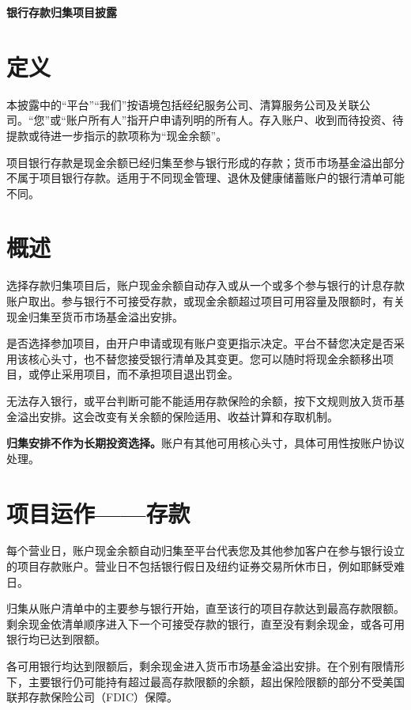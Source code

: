 \documentclass[UTF8,fontset=none,11pt,a4paper]{ctexart}
\begin{document}
{\noindent\fontsize{20}{25}\selectfont\bfseries 银行存款归集项目披露\par}
\vspace{10pt}
\section*{定义}
本披露中的“平台”“我们”按语境包括经纪服务公司、清算服务公司及关联公司。“您”或“账户所有人”指开户申请列明的所有人。存入账户、收到而待投资、待提款或待进一步指示的款项称为“\allowbreak\mbox{现金余额”。}


项目银行存款是现金余额已经归集至参与银行形成的存款；货币市场基金溢出部分不属于项目银行存款。适用于不同现金管理、退休及健康储蓄账户的银行清单\allowbreak\mbox{可能不同。}


\section*{概述}
选择存款归集项目后，账户现金余额自动存入或从一个或多个参与银行的计息存款账户取出。参与银行不可接受存款，或现金余额超过项目可用容量及限额时，有关现金归集至货币市场基金\allowbreak\mbox{溢出安排。}


是否选择参加项目，由开户申请或现有账户变更指示决定。平台不替您决定是否采用该核心头寸，也不替您接受银行清单及其变更。您可以随时将现金余额移出项目，或停止采用项目，而不承担项目\allowbreak\mbox{退出罚金。}


无法存入银行，或平台判断可能不能适用存款保险的余额，按下文规则放入货币基金溢出安排。这会改变有关余额的保险适用、收益计算和\allowbreak\mbox{存取机制。}


\textbf{归集安排不作为长期投资选择。}账户有其他可用核心头寸，具体可用性按账户\allowbreak\mbox{协议处理。}


\section*{项目运作——存款}
每个营业日，账户现金余额自动归集至平台代表您及其他参加客户在参与银行设立的项目存款账户。营业日不包括银行假日及纽约证券交易所休市日，例如耶\allowbreak\mbox{稣受难日。}


归集从账户清单中的主要参与银行开始，直至该行的项目存款达到最高存款限额。剩余现金依清单顺序进入下一个可接受存款的银行，直至没有剩余现金，或各可用银行均已\allowbreak\mbox{达到限额。}


各可用银行均达到限额后，剩余现金进入货币市场基金溢出安排。在个别有限情形下，主要银行仍可能持有超过最高存款限额的余额，超出保险限额的部分不受美国联邦存款保险公司\allowbreak\mbox{（FDIC）保障。}
\end{document}
